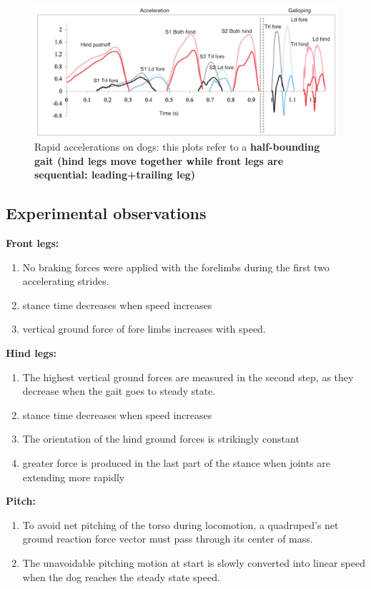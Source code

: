 \begin{figure}[h]
  \centering
  \includegraphics[width=150mm]{figs/RapidAccelerations}
  \caption{Rapid accelerations on dogs: this plots refer to a \textbf{half-bounding gait (hind legs move together while front legs are sequential: leading+trailing leg)}}
  \label{RapAcc}
\end{figure}
\subsection*{Experimental observations}
\begin{multicols}{3}
\textbf{Front legs:}
\begin{enumerate}
\item No braking forces were applied with the forelimbs during the first two accelerating strides.
\item stance time decreases when speed increases
\item vertical ground force of fore limbs increases with speed.
\end{enumerate}
\columnbreak

\textbf{Hind legs:}
\begin{enumerate}
\item The highest vertical ground forces are measured in the second step, as they decrease when the gait goes to steady state.
\item stance time decreases when speed increases
\item The orientation of the hind ground forces is strikingly constant
\item greater force is produced in the last part of the stance when joints are extending more rapidly
\end{enumerate}
\columnbreak

\textbf{Pitch:}
\begin{enumerate}
\item To avoid net pitching of the torso during locomotion, a quadruped’s net ground reaction force vector must pass through its center of mass.
\item The unavoidable pitching motion at start is slowly converted into linear speed when the dog reaches the steady state speed.
\end{enumerate}



\end{multicols}
